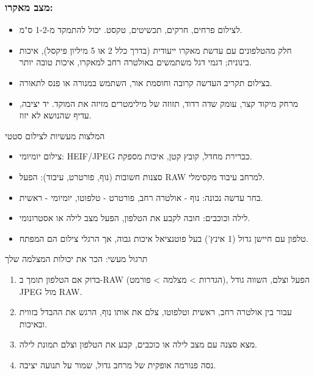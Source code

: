 \subsubsection*{מצב מאקרו:}

\begin{itemize}
  \item לצילום פרחים, חרקים, תכשיטים, טקסט. יכול להתמקד מ-1-2 ס"מ.
  \item חלק מהטלפונים עם עדשת מאקרו ייעודית (בדרך כלל 2 או 5 מיליון פיקסל), איכות בינונית; דגמי דגל משתמשים באולטרה רחב למאקרו, איכות טובה יותר.
  \item בצילום תקריב העדשה קרובה וחוסמת אור, השתמש במנורה או פנס לתאורה.
  \item מרחק מיקוד קצר, עומק שדה רדוד, תזוזה של מילימטרים מזיזה את המוקד. יד יציבה, עדיף שהנושא לא יזוז.
\end{itemize}

\begin{tcbinfo}{המלצות מעשיות לצילום סטטי}
\begin{itemize}
  \item צילום יומיומי: HEIF/JPEG כברירת מחדל, קובץ קטן, איכות מספקת.
  \item סצנות חשובות (נוף, פורטרט, עיבוד): הפעל RAW למרחב עיבוד מקסימלי.
  \item בחר עדשה נכונה: נוף - אולטרה רחב, פורטרט - טלפוטו, יומיומי - ראשית.
  \item לילה וכוכבים: חובה לקבע את הטלפון, הפעל מצב לילה או אסטרונומי.
  \item טלפון עם חיישן גדול (1 אינץ') בעל פוטנציאל איכות גבוה, אך הרגלי צילום הם המפתח.
\end{itemize}

\end{tcbinfo}

\begin{tcbpractice}{תרגול מעשי: הכר את יכולות המצלמה שלך}
\begin{enumerate}
  \item בדוק אם הטלפון תומך ב-RAW (הגדרות > מצלמה > פורמט), הפעל וצלם, השווה גודל JPEG מול RAW.
  \item עבור בין אולטרה רחב, ראשית וטלפוטו, צלם את אותו נוף, הרגש את ההבדל בזווית ובאיכות.
  \item מצא סצנה עם מצב לילה או כוכבים, קבע את הטלפון וצלם תמונת לילה.
  \item נסה פנורמה אופקית של מרחב גדול, שמור על תנועה יציבה.
\end{enumerate}

\end{tcbpractice}
